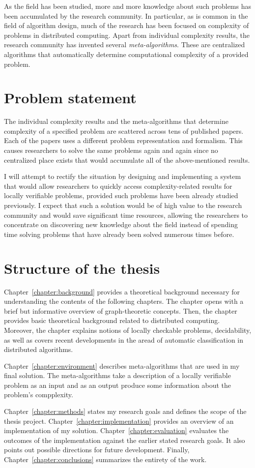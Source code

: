As the field has been studied, more and more knowledge
about such problems has been accumulated by the
research community. In particular, as is common
in the field of algorithm design, much of the
research has been focused on complexity of
problems in distributed computing. Apart from
individual complexity results, the research
community has invented several \emph{meta-algorithms}.
These are centralized algorithms that
automatically determine
computational complexity of a provided
problem.

\section{Problem statement}

The individual complexity results and the meta-algorithms
that determine complexity of a specified problem are
scattered across tens of published papers. Each of the
papers uses a different problem representation and
formalism. This causes researchers to solve
the same problems again and again since no
centralized place exists that would accumulate all of the
above-mentioned results.

I will attempt to rectify the
situation by designing and implementing a system
that would allow researchers to quickly
access complexity-related results for locally
verifiable problems, provided such problems have been
already studied
previously. I expect that such a solution
would be of high value to the research community and
would save significant time resources, allowing the researchers
to concentrate on discovering new knowledge about the
field instead of spending time solving problems that
have already been solved numerous times before.

\section{Structure of the thesis}
\label{section:structure} 

Chapter~\ref{chapter:background} provides a theoretical
background necessary for understanding the contents of the
following chapters. The chapter opens with
a brief but informative overview of graph-theoretic
concepts. Then, the chapter provides basic
theoretical background related to distributed computing.
Moreover, the chapter explains notions of
locally checkable problems, decidability, as well as
covers recent developments in the aread of
automatic classification in distributed algorithms.

Chapter~\ref{chapter:environment} describes
meta-algorithms that are used in my final
solution. The meta-algorithms take a description
of a locally verifiable problem as an input and
as an output produce some information about the
problem's compplexity.

Chapter~\ref{chapter:methods} states my research goals
and defines the scope of the thesis project.
Chapter~\ref{chapter:implementation}
provides an overview of an implementation of
my solution. Chapter~\ref{chapter:evaluation}
evaluates the outcomes of the implementation
against the earlier stated research goals. It
also points out possible directions for
future development. Finally, Chapter~\ref{chapter:conclusions}
summarizes the entirety of the work.
